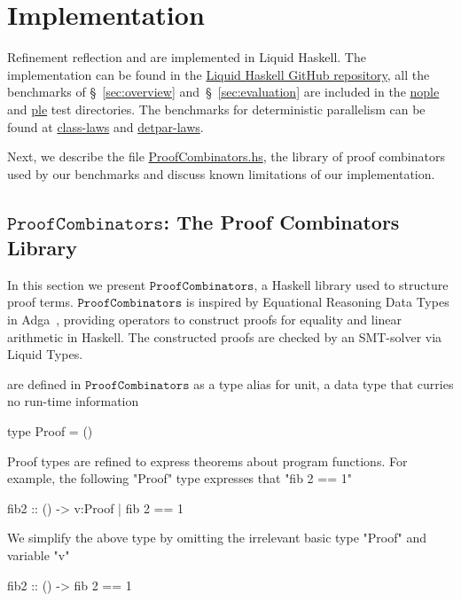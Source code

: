 \section{Implementation} %
\label{appendix:impl}
Refinement reflection and \pbesym are implemented in
Liquid Haskell.
%
The implementation can be found in the
%
\href{https://git.io/vQ6tv}{Liquid Haskell GitHub repository},
%
all the benchmarks of
\S~\ref{sec:overview} and~\S~\ref{sec:evaluation}
are included in the
%
\href{https://git.io/vQ6tf}{nople}
and
\href{https://git.io/vQ6tJ}{ple}
test directories.
%
The benchmarks for deterministic parallelism can be found at
\href{https://git.io/vQ6Lz}{class-laws} and
\href{https://git.io/vQ6L2}{detpar-laws}.


%
Next, we describe the file
%
\href{https://git.io/vQ6tU}{ProofCombinators.hs},
%
the library of proof combinators used by our benchmarks
and discuss known limitations of our implementation.


\newcommand\libname{\ensuremath{\texttt{ProofCombinators}}\xspace}

\subsection{\libname: The Proof Combinators Library}
\label{subsec:library}

In this section we present \libname,
a Haskell library used to structure proof terms.
%
\libname is inspired by Equational Reasoning Data Types
in Adga~\citep{agdaequational}, providing operators to
construct proofs for equality and linear arithmetic in Haskell.
%
The constructed proofs are checked by an SMT-solver via Liquid Types.

 are defined in \libname as a type alias for unit,
a data type that curries no run-time information
%
\begin{code}
  type Proof = ()
\end{code}
%
Proof types are refined to express theorems about program functions.
%
For example, the following "Proof" type expresses that
"fib 2 == 1"
%
\begin{code}
  fib2 :: () -> {v:Proof | fib 2 == 1}
\end{code}
%
We simplify the above type by omitting the irrelevant
basic type "Proof" and variable "v"
%
\begin{code}
  fib2 :: () -> { fib 2 == 1 }
\end{code}
%

